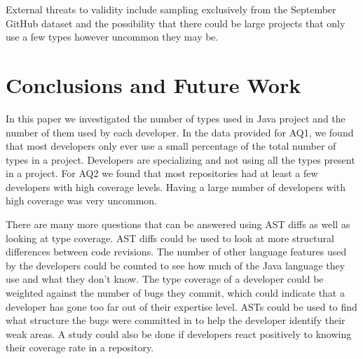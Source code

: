 \documentclass{sig-alternate-05-2015}
\begin{document}
External threats to validity include sampling exclusively from the September GitHub dataset and the possibility that there could be large projects that only use a few types however uncommon they may be.

\section{Conclusions and Future Work}
In this paper we investigated the number of types used in Java project and the number of them used by each developer. In the data provided for AQ1, we found that most developers only ever use a small percentage of the total number of types in a project. Developers are specializing and not using all the types present in a project. For AQ2 we found that most repositories had at least a few developers with high coverage levels. Having a large number of developers with high coverage was very uncommon.

There are many more questions that can be answered using AST diffs as well as looking at type coverage. AST diffs could be used to look at more structural differences between code revisions. The number of other language features used by the developers could be counted to see how much of the Java language they use and what they don’t know.
The type coverage of a developer could be weighted against the number of bugs they commit, which could indicate that a developer has gone too far out of their expertise level. ASTs could be used to find what structure the bugs were committed in to help the developer identify their weak areas. A study could also be done if developers react positively to knowing their coverage rate in a repository.



%

%
%

\end{document}
